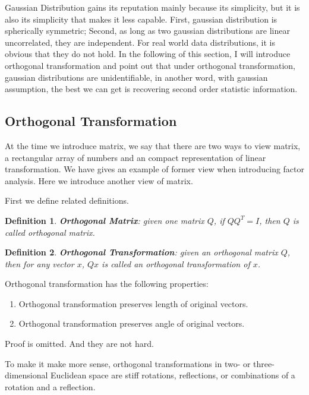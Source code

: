 \documentclass[a4paper]{book}
\newtheorem{definition}{Definition}[section]
\begin{document}
  Gaussian Distribution gains its reputation mainly because its
  simplicity, but it is also its simplicity that makes it less capable.
  First, gaussian distribution is spherically symmetric; Second, as long
  as two gaussian distributions are linear uncorrelated, they are
  independent. For real world data distributions, it is obvious that
  they do not hold. In the following of this section, I will introduce
  orthogonal transformation and point out that under orthogonal
  transformation, gaussian distributions are unidentifiable, in another
  word, with gaussian assumption, the best we can get is recovering
  second order statistic information.

    \subsection{Orthogonal Transformation}
    \label{sec:orthogonal_transformation}
    At the time we introduce matrix, we say that there are two ways to
    view matrix, a rectangular array of numbers and an compact
    representation of linear transformation. We have gives an example of
    former view when introducing factor analysis. Here we introduce
    another view of matrix.

    First we define related definitions.

    \begin{definition}
      \textbf{Orthogonal Matrix}: given one matrix $Q$, if $QQ^{T} = I$,
      then $Q$ is called orthogonal matrix.
    \end{definition}

    \begin{definition}
      \textbf{Orthogonal Transformation}: given an orthogonal matrix $Q$,
      then for any vector $x$, $Qx$ is called an orthogonal transformation
      of $x$.
    \end{definition}

    Orthogonal transformation has the following properties:
    \begin{enumerate}
      \item Orthogonal transformation preserves length of original vectors.
      \item Orthogonal transformation preserves angle of original vectors.
    \end{enumerate}

    Proof is omitted. And they are not hard.

    To make it make more sense, orthogonal transformations in two- or
    three-dimensional Euclidean space are stiff rotations, reflections, or
    combinations of a rotation and a
    reflection\cite{wiki_orthogonal_transformation}.
\end{document}
